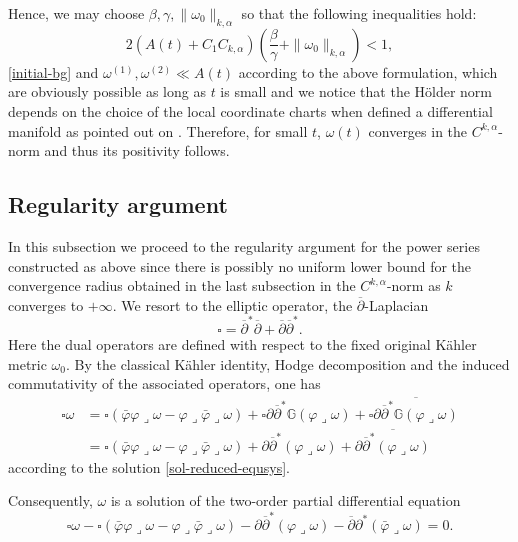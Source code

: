 \documentclass[12pt]{amsart}
\numberwithin{equation}{section}
\renewcommand{\1}{\mathds{1}}
\newcommand{\G}{\mathbb{G}}
\newcommand{\db}{\overline{\partial}}
\renewcommand{\>}{\rightarrow}
\newcommand{\p}{\partial}
\def\p{\partial}
\def\b{\bar}
\def\l{\lrcorner}
\begin{document}
Hence, we may choose $\beta,\gamma,\|\omega_0\|_{k, \alpha}$ so that the
following inequalities hold:
$$2(A(t)+C_1C_{k,\alpha})\left(\frac{\beta}{\gamma}+\|\omega_0\|_{k,\alpha}\right)<1,$$
\eqref{initial-bg} and $\omega^{(1)},\omega^{(2)}\ll A(t)$ according
to the above formulation, which are obviously possible as long as
$t$ is small and we notice that the H\"{o}lder norm depends on the
choice of the local coordinate charts when defined a differential
manifold as pointed out on \cite[Page $275$]{k}. Therefore, for small $t$, $\omega(t)$ converges in the $C^{k,
\alpha}$-norm and thus its positivity follows.

\subsection{Regularity argument}\label{regularity}
In this subsection we proceed to the regularity argument for the
power series constructed as above since there is possibly no uniform
lower bound for the convergence radius obtained in the last
subsection in the $C^{k,\alpha}$-norm as $k$ converges to $+\infty$.
We resort to the elliptic operator, the $\db$-Laplacian
\begin{equation}\label{dbar-Lap}
\square=\db^*\db+\db\db^*.
\end{equation}
Here the dual operators are defined with respect to the fixed
original K\"ahler metric $\omega_0$. By the classical K\"ahler
identity, Hodge decomposition and the induced commutativity of the
associated operators, one has
\begin{align*}
\square\omega
 &=\square(\b{\varphi}\varphi\l\omega-\varphi\l\b{\varphi}\l\omega)
    +\square\p\db^*\G(\varphi\l\omega)+\square\overline{\p\db^*\G(\varphi\l\omega)}\\
 &=\square(\b{\varphi}\varphi\l\omega-\varphi\l\b{\varphi}\l\omega)
    +\p\db^*(\varphi\l\omega)+\overline{\p\db^*(\varphi\l\omega)}
\end{align*}
according to the solution \eqref{sol-reduced-equsys}.


Consequently, $\omega$ is a solution of the two-order partial
differential equation
\begin{equation}\label{ellip-eq}
\square\omega-\square(\b{\varphi}\varphi\l\omega-\varphi\l\b{\varphi}\l\omega)
    -\p\db^*(\varphi\l\omega)-\db\p^*(\b\varphi\l\omega)=0.
\end{equation}
\end{document}
